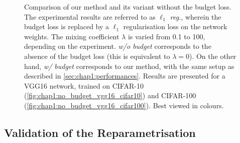 \begin{figure}
  \centering
    \caption{ Comparison of our method and its variant without the budget loss.
    The experimental results are referred to as \emph{$\ell_1$ reg.}, wherein
    the budget loss is replaced by a $\ell_1$ regularisation loss on the network
    weights. The mixing coefficient $\lambda$ is varied from 0.1 to 100,
    depending on the experiment. \emph{w/o budget} corresponds to the absence of
    the budget loss (this is equivalent to $\lambda = 0$). On the other hand,
    \emph{w/ budget} corresponds to our method, with the same setup as described
    in \cref{sec:chap1:performances}. Results are presented for a VGG16 network,
    trained on CIFAR-10 (\cref{fig:chap1:no_budget_vgg16_cifar10}) and CIFAR-100
    (\cref{fig:chap1:no_budget_vgg16_cifar100}). Best viewed in colours.}
  \label{fig:chap1:no_budget_vgg16}
\end{figure}



\subsection{Validation of the Reparametrisation}
\label{sec:chap1:impact_of_reparametrisation}

